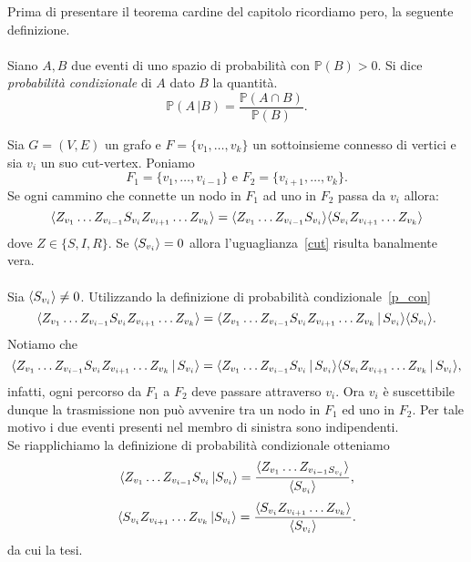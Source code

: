 Prima di presentare il teorema cardine del capitolo  
ricordiamo pero, la seguente definizione.\\ \\
Siano $A,B$ due eventi di uno spazio di probabilit\`a con $\mathbb{P}(B)>0$. Si dice \textit{probabilit\`a condizionale} di $A$ dato $B$ la quantit\`a.
\begin{equation} 
\label{p_con}
\mathbb{P}(A\, \vert B) = \frac{ \mathbb{P}(A\cap B)}{\mathbb{P}(B)}.
\end{equation}

\begin{thm}\label{th_cut-vertex}
Sia $G=(V,E)$ un grafo e $F=\{ v_1, \dots, v_k\}$ un sottoinsieme connesso di vertici e sia $v_i$ un suo cut-vertex. Poniamo  $$ F_1 = \{ v_1, \dots, v_{i-1}\} \text{ e }  F_2 =\{ v_{i+1}, \dots, v_k\}.$$ 
Se ogni cammino che connette un nodo in $F_1$ ad uno in $F_2$ passa da $v_i$ allora: 
\begin{equation}\label{cut}\langle  Z_{v_1}\dots Z_{v_{i-1}} S_{v_i} Z_{v_{i+1}} \dots Z_{v_k} \rangle = \langle  Z_{v_1}\dots Z_{v_{i-1}} S_{v_i} \rangle \langle S_{v_i}  Z_{v_{i+1}} \dots Z_{v_k} \rangle	
\end{equation}
dove $Z\in \{ S,I,R\}$. 
\proof  
Se $\langle S_{v_i} \rangle=0$ allora l'uguaglianza~\eqref{cut} risulta banalmente vera.\\ \\ 
Sia $\langle S_{v_i} \rangle\neq 0 $. Utilizzando la definizione di  probabilit\`a condizionale~\eqref{p_con}
$$ \langle  Z_{v_1}\dots Z_{v_{i-1}} S_{v_i} Z_{v_{i+1}}\dots Z_{v_k} \rangle = \langle  Z_{v_1}\dots Z_{v_{i-1}} S_{v_i} Z_{v_{i+1}}\dots Z_{v_k}\, \vert \, S_{v_i} \rangle \langle S_{v_i} \rangle.$$
Notiamo che $$ \langle  Z_{v_1}\dots Z_{v_{i-1}} S_{v_i} Z_{v_{i+1}}\dots Z_{v_k}\, \vert \, S_{v_i} \rangle = \langle  Z_{v_1}\dots Z_{v_{i-1}} S_{v_i} \, \vert\, S_{v_i} \rangle \langle S_{v_i}Z_{v_{i+1}}\dots Z_{v_k}\, \vert \, S_{v_i} \rangle,$$ 
infatti, ogni percorso da $F_1$ a $F_2$ deve passare attraverso $v_i$. Ora  $v_i$ \`e suscettibile dunque la trasmissione non pu\`o avvenire tra un nodo in $F_1$ ed uno in $F_2$. Per tale motivo i due eventi presenti nel membro di sinistra sono indipendenti.\\
Se riapplichiamo la definizione di probabilit\`a condizionale otteniamo  
$$ \langle  Z_{v_1} \dots Z_{v_{i-1}}S_{v_i} \, \vert S_{v_i} \rangle =\frac{ \langle Z_{v_1} \dots Z_{v_{i-1} S_{v_i}} \rangle}{\langle  S_{v_i} \rangle},$$
$$ \langle  S_{v_i} Z_{v_{i+1}}\dots Z_{v_{k}} \, \vert S_{v_i} \rangle =\frac{ \langle S_{v_i}Z_{v_{i+1}} \dots Z_{v_{k}} \rangle}{\langle  S_{v_i} \rangle}.$$
da cui la tesi.
\endproof
\end{thm}

